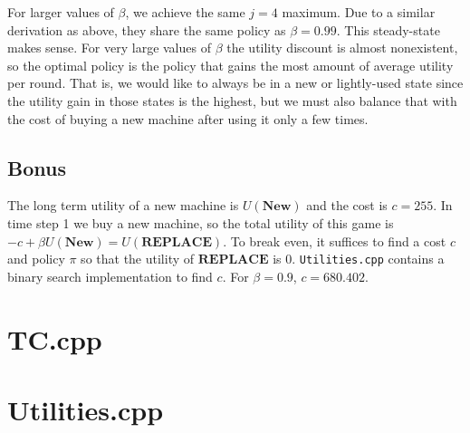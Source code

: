 \documentclass{article}
\begin{document}
For larger values of $\beta$, we achieve the same $j = 4$ maximum. Due to a similar derivation as above, they share the same policy as $\beta = 0.99$. This steady-state makes sense. For very large values of $\beta$ the utility discount is almost nonexistent, so the optimal policy is the policy that gains the most amount of average utility per round. That is, we would like to always be in a new or lightly-used state since the utility gain in those states is the highest, but we must also balance that with the cost of buying a new machine after using it only a few times.

\subsection*{Bonus}
The long term utility of a new machine is $U(\mathbf{New})$ and the cost is $c = 255$. In time step 1 we buy a new machine, so the total utility of this game is $-c + \beta U(\mathbf{New}) = U(\mathbf{REPLACE})$. To break even, it suffices to find a cost $c$ and policy $\pi$ so that the utility of $\mathbf{REPLACE}$ is 0. \verb|Utilities.cpp| contains a binary search implementation to find $c$. For $\beta = 0.9$, $c = 680.402$.

\begin{appendices}
\section{TC.cpp}

\section{Utilities.cpp}


\end{appendices}
\end{document}
